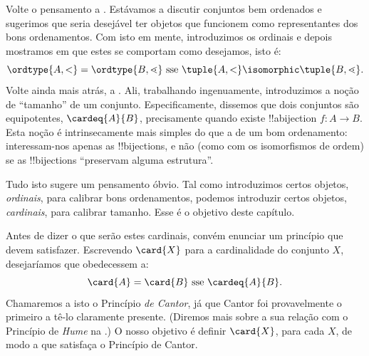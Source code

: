 \documentclass[../../../include/open-logic-section]{subfiles}
\begin{document}

Volte o pensamento a . Estávamos a discutir
conjuntos bem ordenados e sugerimos que seria desejável ter objetos
que funcionem como representantes dos bons ordenamentos. Com isto em mente, introduzimos
os ordinais e depois mostramos em
 que estes
se comportam como desejamos, isto é:
\[
	\ordtype{A, <} = \ordtype{B, \lessdot}
	\text{ sse } \tuple{A, <} \isomorphic \tuple{B, \lessdot}.
\]
Volte ainda mais atrás, a .
Ali, trabalhando ingenuamente, introduzimos a noção de ``tamanho'' de
um conjunto. Especificamente, dissemos que dois conjuntos são equipotentes,
$\cardeq{A}{B}$, precisamente quando existe !!a{bijection} $f \colon A \to
B$. Esta noção é intrinsecamente {mais simples} do que a de um
bom ordenamento: interessam-nos apenas as !!{bijection}s, e não (como
com os isomorfismos de ordem) se as !!{bijection}s ``preservam alguma
estrutura''.

Tudo isto sugere um pensamento óbvio. Tal como introduzimos
certos objetos, \emph{ordinais}, para calibrar bons ordenamentos, podemos
introduzir certos objetos, \emph{cardinais}, para calibrar tamanho. Esse
é o objetivo deste capítulo.

Antes de dizer o que serão estes cardinais, convém enunciar um
princípio que devem satisfazer. Escrevendo $\card{X}$ para a cardinalidade do conjunto $X$, desejaríamos que obedecessem a:
\[
	\card{A} = \card{B} \text{ sse } \cardeq{A}{B}.
\]
Chamaremos a isto o Princípio \emph{de Cantor}, já que Cantor foi
provavelmente o primeiro a tê-lo claramente presente. (Diremos mais sobre a sua
relação com o Princípio de \emph{Hume} na .) O nosso
objetivo é definir $\card{X}$, para cada $X$, de modo a que
satisfaça o Princípio de Cantor.
\end{document}
